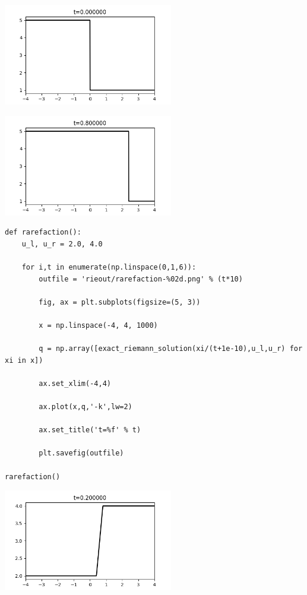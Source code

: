 \documentclass[12pt,fleqn]{article}\usepackage{../../common}
\begin{document}
\includegraphics[width=20em]{rieout/shock-00.png}

\includegraphics[width=20em]{rieout/shock-04.png}


\begin{verbatim}        
def rarefaction():
    u_l, u_r = 2.0, 4.0
    
    for i,t in enumerate(np.linspace(0,1,6)):
        outfile = 'rieout/rarefaction-%02d.png' % (t*10)

        fig, ax = plt.subplots(figsize=(5, 3))
                    
        x = np.linspace(-4, 4, 1000)
        
        q = np.array([exact_riemann_solution(xi/(t+1e-10),u_l,u_r) for xi in x])

        ax.set_xlim(-4,4)

        ax.plot(x,q,'-k',lw=2)
    
        ax.set_title('t=%f' % t)

        plt.savefig(outfile)

rarefaction()
\end{verbatim}


\includegraphics[width=20em]{rieout/rarefaction-02.png}
\end{document}
